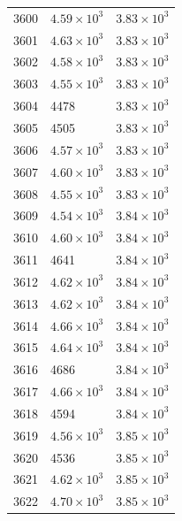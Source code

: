 \begin{table}[H]
\begin{tabular}{lll}
3600 & $\displaystyle 4.59 \times 10^{3}$ & $\displaystyle 3.83 \times 10^{3}$ \\
3601 & $\displaystyle 4.63 \times 10^{3}$ & $\displaystyle 3.83 \times 10^{3}$ \\
3602 & $\displaystyle 4.58 \times 10^{3}$ & $\displaystyle 3.83 \times 10^{3}$ \\
3603 & $\displaystyle 4.55 \times 10^{3}$ & $\displaystyle 3.83 \times 10^{3}$ \\
3604 & 4478 & $\displaystyle 3.83 \times 10^{3}$ \\
3605 & 4505 & $\displaystyle 3.83 \times 10^{3}$ \\
3606 & $\displaystyle 4.57 \times 10^{3}$ & $\displaystyle 3.83 \times 10^{3}$ \\
3607 & $\displaystyle 4.60 \times 10^{3}$ & $\displaystyle 3.83 \times 10^{3}$ \\
3608 & $\displaystyle 4.55 \times 10^{3}$ & $\displaystyle 3.83 \times 10^{3}$ \\
3609 & $\displaystyle 4.54 \times 10^{3}$ & $\displaystyle 3.84 \times 10^{3}$ \\
3610 & $\displaystyle 4.60 \times 10^{3}$ & $\displaystyle 3.84 \times 10^{3}$ \\
3611 & 4641 & $\displaystyle 3.84 \times 10^{3}$ \\
3612 & $\displaystyle 4.62 \times 10^{3}$ & $\displaystyle 3.84 \times 10^{3}$ \\
3613 & $\displaystyle 4.62 \times 10^{3}$ & $\displaystyle 3.84 \times 10^{3}$ \\
3614 & $\displaystyle 4.66 \times 10^{3}$ & $\displaystyle 3.84 \times 10^{3}$ \\
3615 & $\displaystyle 4.64 \times 10^{3}$ & $\displaystyle 3.84 \times 10^{3}$ \\
3616 & 4686 & $\displaystyle 3.84 \times 10^{3}$ \\
3617 & $\displaystyle 4.66 \times 10^{3}$ & $\displaystyle 3.84 \times 10^{3}$ \\
3618 & 4594 & $\displaystyle 3.84 \times 10^{3}$ \\
3619 & $\displaystyle 4.56 \times 10^{3}$ & $\displaystyle 3.85 \times 10^{3}$ \\
3620 & 4536 & $\displaystyle 3.85 \times 10^{3}$ \\
3621 & $\displaystyle 4.62 \times 10^{3}$ & $\displaystyle 3.85 \times 10^{3}$ \\
3622 & $\displaystyle 4.70 \times 10^{3}$ & $\displaystyle 3.85 \times 10^{3}$ \\

\end{tabular}
\end{table}
